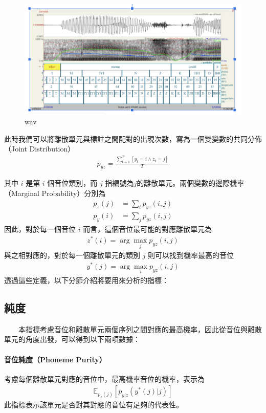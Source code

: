 {        \begin{figure}
            \centering
            \includegraphics[width=0.5\linewidth]{figures/wav.png}
            \caption{wav}
            \label{fig:enter-labelwav}
        \end{figure}
        此時我們可以將離散單元與標註之間配對的出現次數，寫為一個雙變數的共同分佈（Joint Distribution）
\begin{align}
    p_{yz} = \frac{\sum^T_{t=1}[{y_t = i \wedge z_t = j}]}{T}
\end{align}

其中 $i$ 是第 $i$ 個音位類別，而 $j$ 指編號為$j$的離散單元。兩個變數的邊際機率（Marginal Probability）分別為
\begin{align}
    p_z(j) & =\sum_i{p_{yz}(i, j)} \\
    p_y(i) & =\sum_j{p_{yz}(i, j)}
\end{align}
因此，對於每一個音位 $i$ 而言，這個音位最可能的對應離散單元為
\begin{align}
    z^\ast(i) = \arg\max_j p_{yz}(i, j)
\end{align}
與之相對應的，對於每一個離散單元的類別 $j$ 則可以找到機率最高的音位
\begin{align}
    y^\ast(j) = \arg\max_i p_{yz}(i,j)
\end{align}
透過這些定義，以下分節介紹將要用來分析的指標：

\subsection{純度}

　　本指標考慮音位和離散單元兩個序列之間對應的最高機率，因此從音位與離散單元的角度出發，可以得到以下兩項數據：

\paragraph{音位純度（Phoneme Purity）}\hfill \break
%
        考慮每個離散單元對應的音位中，最高機率音位的機率，表示為
\begin{align}
    \mathbb{E}_{p_z(j)}\left[p_{y|z}(y^*(j)|j) \right]
\end{align}
此指標表示該單元是否對其對應的音位有足夠的代表性。

}
